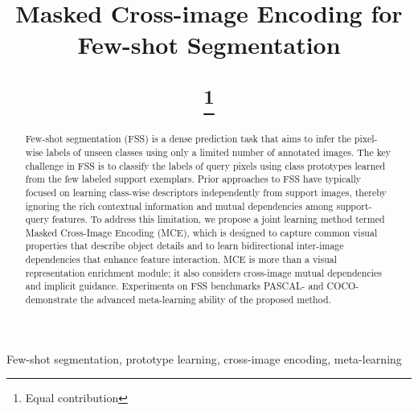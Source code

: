 \documentclass[conference]{IEEEtran}
\begin{document}
\title{Masked Cross-image Encoding for Few-shot Segmentation

\thanks{Equal contribution}
}




\author{
}
\maketitle

\begin{abstract}
Few-shot segmentation (FSS) is a dense prediction task that aims to infer the pixel-wise labels of unseen classes using only a limited number of annotated images. The key challenge in FSS is to classify the labels of query pixels using class prototypes learned from the few labeled support exemplars. Prior approaches to FSS have typically focused on learning class-wise descriptors independently from support images, thereby ignoring the rich contextual information and mutual dependencies among support-query features. To address this limitation, we propose a joint learning method termed Masked Cross-Image Encoding (MCE), which is designed to capture common visual properties that describe object details and to learn bidirectional inter-image dependencies that enhance feature interaction. MCE is more than a visual representation enrichment module; it also considers cross-image mutual dependencies and implicit guidance. Experiments on FSS benchmarks PASCAL- and COCO- demonstrate the advanced meta-learning ability of the proposed method.
\end{abstract}

\begin{IEEEkeywords}
Few-shot segmentation, prototype learning, cross-image encoding, meta-learning
\end{IEEEkeywords}
\end{document}

